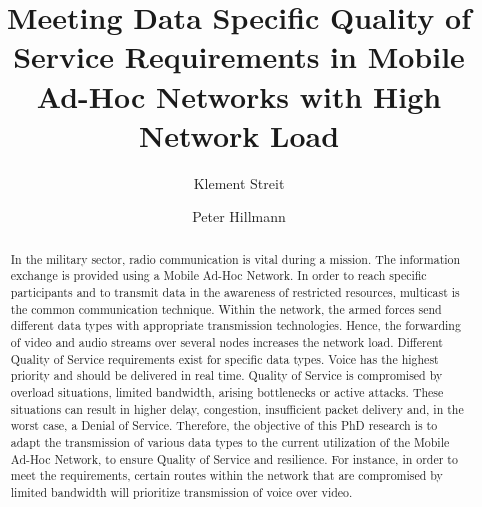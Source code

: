 \documentclass[runningheads]{llncs}
\begin{document}
\title{Meeting Data Specific Quality of Service Requirements in Mobile Ad-Hoc Networks with High Network Load}
%
\author{Klement Streit \and Peter Hillmann
}
%
%
%

\maketitle              %

\begin{abstract}
 In the military sector, radio communication is vital during a mission. The information exchange is provided using a Mobile Ad-Hoc Network. In order to reach specific participants and to transmit data in the awareness of restricted resources, multicast is the common communication technique. Within the network, the armed forces send different data types with appropriate transmission technologies. Hence, the forwarding of video and audio streams over several nodes increases the network load. Different Quality of Service requirements exist for specific data types. Voice has the highest priority and should be delivered in real time. Quality of Service is compromised by overload situations, limited bandwidth, arising bottlenecks or active attacks. These situations can result in higher delay, congestion, insufficient packet delivery and, in the worst case, a Denial of Service. Therefore, the objective of this PhD research is to adapt the transmission of various data types to the current utilization of the Mobile Ad-Hoc Network, to ensure Quality of Service and resilience. For instance, in order to meet the requirements, certain routes within the network that are compromised by limited bandwidth will prioritize transmission of voice over video.

\end{abstract}
%
\end{document}
